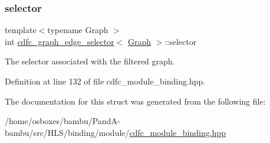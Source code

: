 \subsubsection{\texorpdfstring{selector}{selector}}
{\footnotesize\ttfamily template$<$typename Graph $>$ \\
int \hyperlink{structcdfc__graph__edge__selector}{cdfc\+\_\+graph\+\_\+edge\+\_\+selector}$<$ \hyperlink{structGraph}{Graph} $>$\+::selector\hspace{0.3cm}{\ttfamily [private]}}



The selector associated with the filtered graph. 



Definition at line 132 of file cdfc\+\_\+module\+\_\+binding.\+hpp.



The documentation for this struct was generated from the following file\+:\begin{DoxyCompactItemize}
\item 
/home/osboxes/bambu/\+Pand\+A-\/bambu/src/\+H\+L\+S/binding/module/\hyperlink{cdfc__module__binding_8hpp}{cdfc\+\_\+module\+\_\+binding.\+hpp}\end{DoxyCompactItemize}
